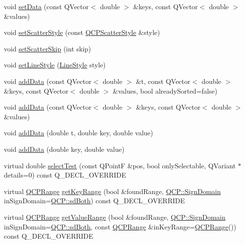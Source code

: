 \begin{DoxyCompactItemize}
\item 
void \hyperlink{classQCPCurve_a9d3245d43304226e013240c94802f7f6}{set\+Data} (const Q\+Vector$<$ double $>$ \&keys, const Q\+Vector$<$ double $>$ \&values)
\item 
void \hyperlink{classQCPCurve_a55e43b44709bf50a35500644988aa706}{set\+Scatter\+Style} (const \hyperlink{classQCPScatterStyle}{Q\+C\+P\+Scatter\+Style} \&style)
\item 
void \hyperlink{classQCPCurve_a97dbfecd497e972d5f2162615e6da5be}{set\+Scatter\+Skip} (int skip)
\item 
void \hyperlink{classQCPCurve_a4a377ec863ff81a1875c3094a6177c19}{set\+Line\+Style} (\hyperlink{classQCPCurve_a2710e9f79302152cff794c6e16cc01f1}{Line\+Style} style)
\item 
void \hyperlink{classQCPCurve_a73edf394b94f3f24f07518e30565a07f}{add\+Data} (const Q\+Vector$<$ double $>$ \&t, const Q\+Vector$<$ double $>$ \&keys, const Q\+Vector$<$ double $>$ \&values, bool already\+Sorted=false)
\item 
void \hyperlink{classQCPCurve_a6424fa06da1786648c83ad13a0d0aa14}{add\+Data} (const Q\+Vector$<$ double $>$ \&keys, const Q\+Vector$<$ double $>$ \&values)
\item 
void \hyperlink{classQCPCurve_a13398b236f6926014e404eeb5b9f415c}{add\+Data} (double t, double key, double value)
\item 
void \hyperlink{classQCPCurve_ada4762e793cd5707b33f35b8a4b0f8fb}{add\+Data} (double key, double value)
\item 
virtual double \hyperlink{classQCPCurve_a0ed9b7e6b4bc72010d6fcd974af46a8b}{select\+Test} (const Q\+PointF \&pos, bool only\+Selectable, Q\+Variant $\ast$details=0) const Q\+\_\+\+D\+E\+C\+L\+\_\+\+O\+V\+E\+R\+R\+I\+DE
\item 
virtual \hyperlink{classQCPRange}{Q\+C\+P\+Range} \hyperlink{classQCPCurve_a22d09087f78f254731197cc0b8783299}{get\+Key\+Range} (bool \&found\+Range, \hyperlink{namespaceQCP_afd50e7cf431af385614987d8553ff8a9}{Q\+C\+P\+::\+Sign\+Domain} in\+Sign\+Domain=\hyperlink{namespaceQCP_afd50e7cf431af385614987d8553ff8a9aa38352ef02d51ddfa4399d9551566e24}{Q\+C\+P\+::sd\+Both}) const Q\+\_\+\+D\+E\+C\+L\+\_\+\+O\+V\+E\+R\+R\+I\+DE
\item 
virtual \hyperlink{classQCPRange}{Q\+C\+P\+Range} \hyperlink{classQCPCurve_a8bb8e3b9085f15921dc40483fb025ab2}{get\+Value\+Range} (bool \&found\+Range, \hyperlink{namespaceQCP_afd50e7cf431af385614987d8553ff8a9}{Q\+C\+P\+::\+Sign\+Domain} in\+Sign\+Domain=\hyperlink{namespaceQCP_afd50e7cf431af385614987d8553ff8a9aa38352ef02d51ddfa4399d9551566e24}{Q\+C\+P\+::sd\+Both}, const \hyperlink{classQCPRange}{Q\+C\+P\+Range} \&in\+Key\+Range=\hyperlink{classQCPRange}{Q\+C\+P\+Range}()) const Q\+\_\+\+D\+E\+C\+L\+\_\+\+O\+V\+E\+R\+R\+I\+DE
\end{DoxyCompactItemize}
